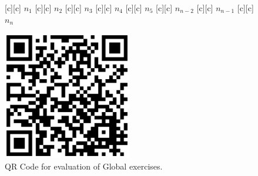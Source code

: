 \begin{figure}[ht]
	\centering
	\footnotesize

	[c] {$n_1$}
	[c] {$n_2$}
	[c] {$n_3$}
	[c] {$n_4$}
	[c] {$n_5$}
	[c] {$n_{n-2}$}
	[c] {$n_{n-1}$}
	[c] {$n_{n}$}

	\includegraphics[width=0.5\textwidth]{evaluationQR.eps}

	\caption{QR Code for evaluation of Global exercises.}
	\label{\LABEL}
\end{figure}